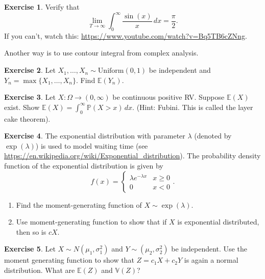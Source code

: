 \documentclass[
  openany]{book}
\theoremstyle{definition}
\theoremstyle{definition}
\theoremstyle{definition}
\newtheorem{exercise}{Exercise}[chapter]
\theoremstyle{definition}
\theoremstyle{remark}
\begin{document}
\begin{exercise}
Verify that
\[\lim_{T \to \infty} \int_0^\infty \frac{\sin(x)}{x} \, dx = \frac{\pi}{2}.\]
If you can't, watch this:
\url{https://www.youtube.com/watch?v=Bq5TB6cZNng}.

Another way is to use contour integral from complex analysis.
\end{exercise}

\begin{exercise}
Let \(X_1, \dots, X_n \sim \mathrm{Uniform}(0,1)\) be independent and \(Y_n = \max\{ X_1, \dots, X_n  \}\).
Find \(\mathbb{E}(Y_n)\).
\end{exercise}

\begin{exercise}
Let \(X:\Omega \to (0,\infty)\) be continuous positive RV. Suppose \(\mathbb{E}(X)\) exist.
Show
\(\mathbb{E}(X) = \int_0^\infty \mathbb{P}(X > x) \, dx\).
(Hint: Fubini. This is called the layer cake theorem).
\end{exercise}

\begin{exercise}

The exponential distribution with parameter \(\lambda\) (denoted by \(\exp(\lambda)\))
is used to model waiting time (see \url{https://en.wikipedia.org/wiki/Exponential_distribution}).
The probability density function of the exponential distribution is given by
\[f(x) = \begin{cases} \lambda e^{-\lambda x} & x\geq 0 \\ 0 & x< 0 \end{cases}.\]

\begin{enumerate}
\def\labelenumi{\arabic{enumi}.}
\item
  Find the moment-generating function of \(X \sim \exp(\lambda)\).
\item
  Use moment-generating function to show that if \(X\) is exponential distributed,
  then so is \(cX\).
\end{enumerate}

\end{exercise}

\begin{exercise}
Let \(X \sim N(\mu_1, \sigma_1^2)\) and \(Y \sim (\mu_2, \sigma_2^2)\) be independent.
Use the moment generating function to show that \(Z = c_1 X + c_2 Y\) is again a normal distribution.
What are \(\mathbb{E}(Z)\) and \(\mathbb{V}(Z)\)?
\end{exercise}
\end{document}
